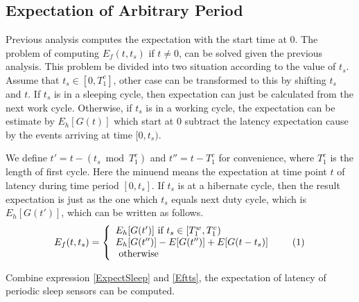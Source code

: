 \documentclass[conference]{IEEEtran}
\newcommand\numberthis{\addtocounter{equation}{1}\tag{\theequation}}
\begin{document}
\subsection{Expectation of Arbitrary Period}
Previous analysis computes the expectation with the start time at $0$. The problem of computing $E_f(t,t_s)$ if $t\ne0$, can be solved given the previous analysis. This problem be divided into two situation according to the value of $t_s$.
Assume that $t_s\in [0,T^{c}_{1}]$, other case can be transformed to this by shifting $t_s$ and $t$.
If $t_s$ is in a sleeping cycle, then expectation can just be calculated from the next work cycle.
Otherwise, if $t_s$ is in a working cycle, the expectation can be estimate by $E_h[G(t)]$ which start at $0$ subtract the latency expectation cause by the events arriving at time $[0, t_s)$.

We define $t'=t-(t_s\bmod T^{c}_{1})$ and $t''=t-T^{c}_{1}$ for convenience, where $T^{c}_{1}$ is the length of first cycle.
Here the minuend means the expectation at time point $t$ of latency during time period $[0, t_s]$.
If $t_s$ is at a hibernate cycle, then the result expectation is just as the one which $t_s$ equals next duty cycle, which is $E_h[G(t')]$, which can be written as follows.
\[E_f(t,t_s)=\left\{
    \begin{array}{lr}
    E_h[G(t')]\text{ if } t_s\in [T^{w}_{1}, T^{c}_{1})\\
    E_h[G(t'')]-E[G(t'')]+E[G(t-t_s)]\\
    \text{ otherwise }
    \end{array}\numberthis \label{Eftts}
    \right.
\]

Combine expression \eqref{ExpectSleep} and \eqref{Eftts}, the expectation of latency of periodic sleep sensors can be computed.
\end{document}
